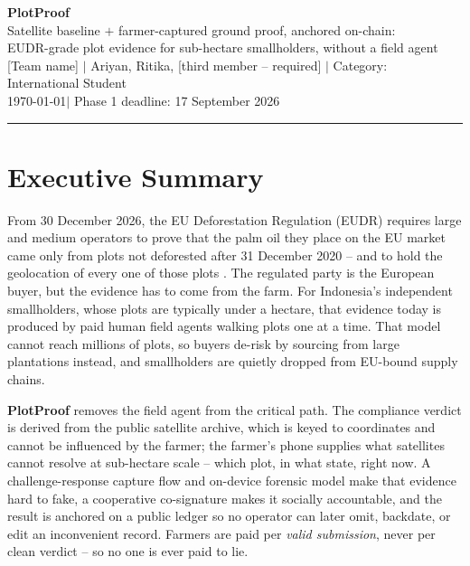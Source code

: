 \documentclass[11pt]{article}
\newcommand{\teamfield}[1]{\textcolor{gray!70}{[#1]}}
\begin{document}
\begin{center}
  {\Huge\bfseries\color{accent} PlotProof}\\[0.4em]
  {\large Satellite baseline $+$ farmer-captured ground proof, anchored on-chain:}\\
  {\large EUDR-grade plot evidence for sub-hectare smallholders, without a field agent}\\[1em]
  \teamfield{Team name} \quad $\vert$ \quad Ariyan, Ritika, \teamfield{third member -- required} \quad $\vert$ \quad Category: International Student\\[0.3em]
  \today \quad $\vert$ \quad Phase 1 deadline: 17 September 2026
\end{center}

\vspace{0.5em}
\noindent\textcolor{ruleclr}{\rule{\linewidth}{0.6pt}}
\vspace{0.5em}

\section{Executive Summary}
From 30 December 2026, the EU Deforestation Regulation (EUDR) requires large and medium operators to prove that the palm oil they place on the EU market came only from plots not deforested after 31 December 2020 -- and to hold the geolocation of every one of those plots \cite{eudr-dates,eudr-text}. The regulated party is the European buyer, but the evidence has to come from the farm. For Indonesia's independent smallholders, whose plots are typically under a hectare, that evidence today is produced by paid human field agents walking plots one at a time. That model cannot reach millions of plots, so buyers de-risk by sourcing from large plantations instead, and smallholders are quietly dropped from EU-bound supply chains.

\textbf{PlotProof} removes the field agent from the critical path. The compliance verdict is derived from the public satellite archive, which is keyed to coordinates and cannot be influenced by the farmer; the farmer's phone supplies what satellites cannot resolve at sub-hectare scale -- which plot, in what state, right now. A challenge-response capture flow and on-device forensic model make that evidence hard to fake, a cooperative co-signature makes it socially accountable, and the result is anchored on a public ledger so no operator can later omit, backdate, or edit an inconvenient record. Farmers are paid per \emph{valid submission}, never per clean verdict -- so no one is ever paid to lie.
\end{document}

